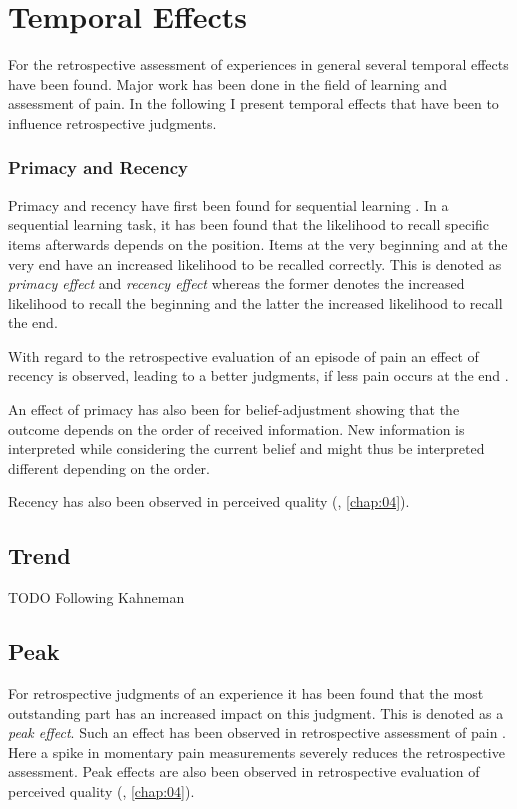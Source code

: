 
\section{Temporal Effects}

For the retrospective assessment of experiences in general several temporal effects have been found.
Major work has been done in the field of learning and assessment of pain.
In the following I present temporal effects that have been to influence retrospective judgments.

\subsubsection*{Primacy and Recency}
Primacy and recency have first been found for sequential learning \citep[\cf,][]{murdock_jr._serial_1962}.
In a sequential learning task, it has been found that the likelihood to recall specific items afterwards depends on the position.
Items at the very beginning and at the very end have an increased likelihood to be recalled correctly.
This is denoted as \emph{primacy effect} and \emph{recency effect} whereas the former denotes the increased likelihood to recall the beginning and the latter the increased likelihood to recall the end.

With regard to the retrospective evaluation of an episode of pain an effect of recency is observed, leading to a better judgments, if less pain occurs at the end \citep[\cf,][]{kahneman_when_1993, redelmeier_patients_1996}.

An effect of primacy has also been for belief-adjustment showing that the outcome depends on the order of received information.
New information is interpreted while considering the current belief and might thus be interpreted different depending on the order.

Recency has also been observed in perceived quality (\cf, \autoref{chap:04}).

\subsection*{Trend}

TODO Following Kahneman

\subsection*{Peak}
For retrospective judgments of an experience it has been found that the most outstanding part has an increased impact on this judgment.
This is denoted as a \emph{peak effect}.
Such an effect has been observed in retrospective assessment of pain \citep[\cf,][]{kahneman_when_1993, redelmeier_patients_1996}.
Here a spike in momentary pain measurements severely reduces the retrospective assessment.
Peak effects are also been observed in retrospective evaluation of perceived quality (\cf, \autoref{chap:04}).

